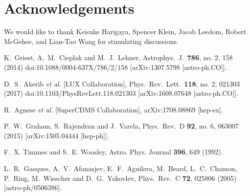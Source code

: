 \documentclass[twocolumn, preprintnumbers,amsmath,amssymb,prd, superscriptaddress]{revtex4}
\begin{document}
\section*{Acknowledgements}
We would like to thank Keisuke Harigaya, Spencer Klein, Jacob Leedom, Robert McGehee, and Lian-Tao Wang for stimulating discussions.

\begin{thebibliography}{99}


  K.~Griest, A.~M.~Cieplak and M.~J.~Lehner,
  Astrophys.\ J.\  {\bf 786}, no. 2, 158 (2014)
  doi:10.1088/0004-637X/786/2/158
  [arXiv:1307.5798 [astro-ph.CO]].

  D.~S.~Akerib {\it et al.} [LUX Collaboration],
  Phys.\ Rev.\ Lett.\  {\bf 118}, no. 2, 021303 (2017)
  doi:10.1103/PhysRevLett.118.021303
  [arXiv:1608.07648 [astro-ph.CO]].

  R.~Agnese {\it et al.} [SuperCDMS Collaboration],
  arXiv:1708.08869 [hep-ex].

  P.~W.~Graham, S.~Rajendran and J.~Varela,
  Phys.\ Rev.\ D {\bf 92}, no. 6, 063007 (2015)
  [arXiv:1505.04444 [hep-ph]].


 F.~X. Timmes and S.~E. Woosley, Astro. Phys. Journal {\bf 396}, 649 (1992).

  L.~R.~Gasques, A.~V.~Afanasjev, E.~F.~Aguilera, M.~Beard, L.~C.~Chamon, P.~Ring, M.~Wiescher and D.~G.~Yakovlev,
  Phys.\ Rev.\ C {\bf 72}, 025806 (2005)
  [astro-ph/0506386].



\end{thebibliography}
\end{document}
